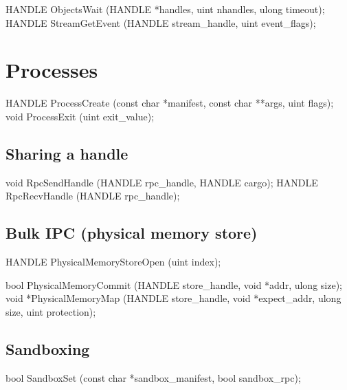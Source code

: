\begin{paldef}
HANDLE ObjectsWait    (HANDLE *handles, uint nhandles,
                       ulong timeout);
HANDLE StreamGetEvent (HANDLE stream_handle,
                       uint event_flags);
\end{paldef}




\section{Processes}
\label{sec:abi:proc}



\begin{paldef}
HANDLE ProcessCreate (const char *manifest,
                      const char **args, uint flags);
void ProcessExit (uint exit_value);
\end{paldef}



\subsection*{Sharing a handle}


\begin{paldef}
void   RpcSendHandle (HANDLE rpc_handle, HANDLE cargo);
HANDLE RpcRecvHandle (HANDLE rpc_handle);
\end{paldef}



\subsection*{Bulk IPC (physical memory store)}


\begin{paldef}
HANDLE PhysicalMemoryStoreOpen (uint index);
\end{paldef}



\begin{paldef}
bool  PhysicalMemoryCommit (HANDLE store_handle,
                            void *addr, ulong size);
void *PhysicalMemoryMap (HANDLE store_handle,
                         void *expect_addr, ulong size,
                         uint protection);
\end{paldef}


\subsection*{Sandboxing}


\begin{paldef}
bool SandboxSet (const char *sandbox_manifest,
                 bool sandbox_rpc);
\end{paldef}